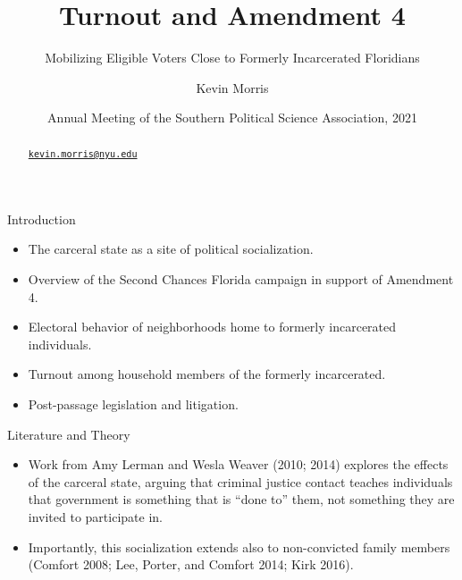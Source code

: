 \documentclass[
  ignorenonframetext,
  aspectratio=169]{beamer}
\title{Turnout and Amendment 4}
\subtitle{Mobilizing Eligible Voters Close to Formerly Incarcerated
Floridians}
\author{Kevin Morris}
\date{Annual Meeting of the Southern Political Science Association,
2021}
\institute{Brennan Center for Justice}
\providecommand{\tightlist}{%
  \setlength{\itemsep}{0pt}\setlength{\parskip}{0pt}}
\begin{document}
\frame{\titlepage}
\begin{abstract}
\href{mailto:kevin.morris@nyu.edu}{\nolinkurl{kevin.morris@nyu.edu}}
\end{abstract}

\begin{frame}{Introduction}
\protect\hypertarget{introduction}{}
\begin{itemize}[<+->]
\tightlist
\item
  The carceral state as a site of political socialization.
\end{itemize}

\begin{itemize}[<+->]
\tightlist
\item
  Overview of the Second Chances Florida campaign in support of
  Amendment 4.
\end{itemize}

\begin{itemize}[<+->]
\tightlist
\item
  Electoral behavior of neighborhoods home to formerly incarcerated
  individuals.
\end{itemize}

\begin{itemize}[<+->]
\tightlist
\item
  Turnout among household members of the formerly incarcerated.
\end{itemize}

\begin{itemize}[<+->]
\tightlist
\item
  Post-passage legislation and litigation.
\end{itemize}
\end{frame}

\begin{frame}{Literature and Theory}
\protect\hypertarget{literature-and-theory}{}
\begin{itemize}[<+->]
\tightlist
\item
  Work from Amy Lerman and Wesla Weaver (2010; 2014) explores the
  effects of the carceral state, arguing that criminal justice contact
  teaches individuals that government is something that is ``done to''
  them, not something they are invited to participate in.
\end{itemize}

\begin{itemize}[<+->]
\tightlist
\item
  Importantly, this socialization extends also to non-convicted family
  members (Comfort 2008; Lee, Porter, and Comfort 2014; Kirk 2016).
\end{itemize}
\end{frame}
\end{document}
